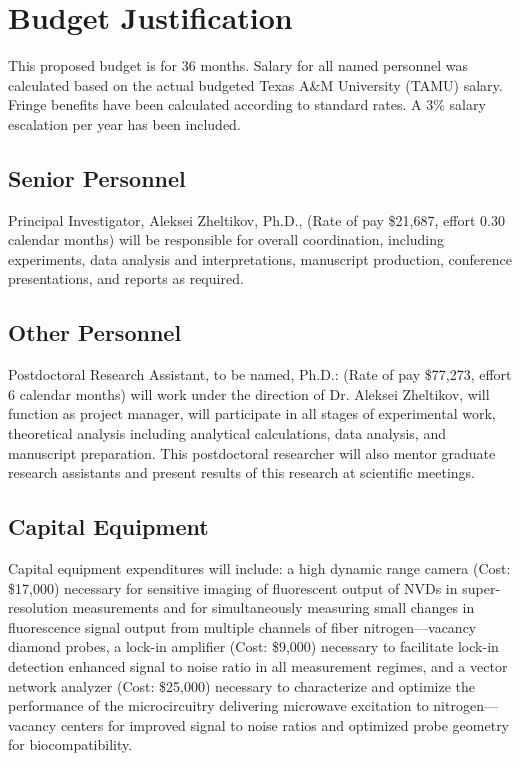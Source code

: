 \section{Budget Justification}
This proposed budget is for 36 months. Salary for all named personnel was calculated based on the actual budgeted Texas A\&M University (TAMU) salary.  Fringe benefits have been calculated according to standard rates.  A 3\% salary escalation per year has been included.

\subsection{Senior Personnel}
Principal Investigator, Aleksei Zheltikov, Ph.D., (Rate of pay \$21,687, effort 0.30 calendar months) will be responsible for overall coordination, including experiments, data analysis and interpretations, manuscript production, conference presentations, and reports as required.

\subsection{Other Personnel}
Postdoctoral Research Assistant, to be named, Ph.D.: (Rate of pay \$77,273, effort 6 calendar months) will work under the direction of Dr. Aleksei Zheltikov, will function as project manager, will participate in all stages of experimental work, theoretical analysis including analytical calculations, data analysis, and manuscript preparation.  This postdoctoral researcher will also mentor graduate research assistants and present results of this research at scientific meetings.

\subsection{Capital Equipment}
Capital equipment expenditures will include: a high dynamic range camera (Cost: \$17,000) necessary for sensitive 
imaging of fluorescent output of NVDs in super-resolution measurements and for simultaneously measuring small 
changes in fluorescence signal output from multiple channels of fiber nitrogen—vacancy diamond probes, a lock-in 
amplifier (Cost: \$9,000) necessary to facilitate lock-in detection enhanced signal to noise ratio in all 
measurement regimes, and a vector network analyzer (Cost: \$25,000) necessary to characterize and optimize the 
performance of the microcircuitry delivering microwave excitation to nitrogen—vacancy centers for improved signal 
to noise ratios and optimized probe geometry for biocompatibility.

